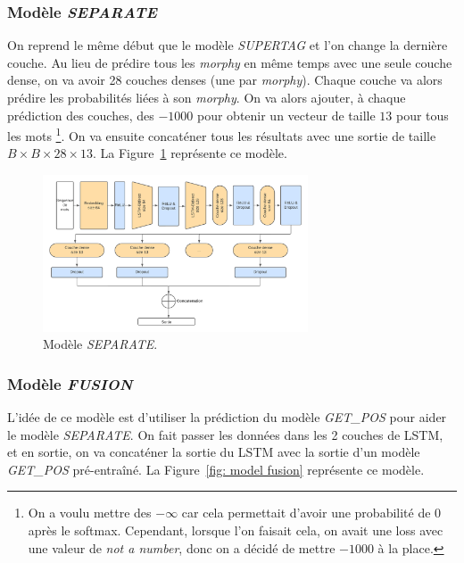 \documentclass[a4paper]{article}
\begin{document}
\subsubsection{Modèle \textit{SEPARATE}}

On reprend le même début que le modèle \textit{SUPERTAG} et l'on change la dernière couche. Au lieu de prédire tous les 
\textit{morphy} en même temps avec une seule couche dense, on va avoir 28 couches denses (une par \textit{morphy}). Chaque couche
va alors prédire les probabilités liées à son \textit{morphy}. On va alors ajouter, à chaque prédiction des couches, des $- 1000$
pour obtenir un vecteur de taille $13$ pour tous les mots
\footnote{On a voulu mettre des $-\infty$ car cela permettait d'avoir une probabilité de $0$ après le softmax. Cependant, 
lorsque l'on faisait cela, on avait une loss avec une valeur de \textit{not a number}, donc on a décidé de mettre $-1000$ à 
la place.}.
On va ensuite concaténer tous les résultats avec une sortie de 
taille $B \times B \times 28 \times 13$. La Figure~\ref{fig: model separate} représente ce modèle.

\begin{figure}[H]
    \centering
    \includegraphics[width=0.7\textwidth]{get_morphy_separate.png}
    \caption{Modèle \textit{SEPARATE}.}
    \label{fig: model separate}
\end{figure}

\subsubsection{Modèle \textit{FUSION}}

L'idée de ce modèle est d'utiliser la prédiction du modèle \textit{GET\_POS} pour aider le modèle \textit{SEPARATE}.
On fait passer les données dans les 2 couches de LSTM, et en sortie, on va concaténer la sortie du LSTM avec la sortie
d'un modèle \textit{GET\_POS} pré-entraîné.
La Figure~\ref{fig: model fusion} représente ce modèle.
\end{document}
